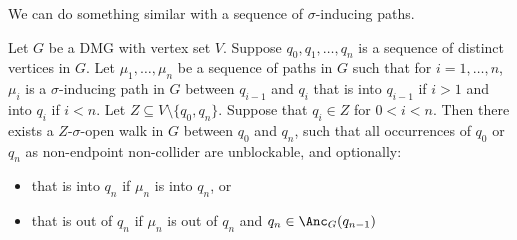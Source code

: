 We can do something similar with a sequence of $\sigma$-inducing paths.
\begin{Lem}\label{lem:dpag_concatenating_sigma-inducing_paths_into_open_walk}
  Let $G$ be a DMG with vertex set $V$. 
  Suppose $q_0, q_1, \dots, q_n$ is a sequence of distinct vertices in $G$.
  Let $\mu_1,\dots,\mu_n$ be a sequence of paths in $G$ such that for $i=1,\dots,n$, $\mu_i$ is a $\sigma$-inducing path in $G$ between $q_{i-1}$ and $q_i$ that is into $q_{i-1}$ if $i > 1$ and into $q_i$ if $i < n$.
  Let $Z \subseteq V \setminus \{q_0,q_n\}$.
  Suppose that $q_i \in Z$ for $0 < i < n$.
  Then there exists a $Z$-$\sigma$-open walk in $G$ between $q_0$ and $q_n$, such that all occurrences of $q_0$ or $q_n$ as non-endpoint non-collider are unblockable, and optionally:
  \begin{itemize}
    \item that is into $q_n$ if $\mu_n$ is into $q_n$, or
    \item that is out of $q_n$ if $\mu_n$ is out of $q_n$ and $q_n \in \Anc_G(q_{n-1})$
  \end{itemize}
\end{Lem}
